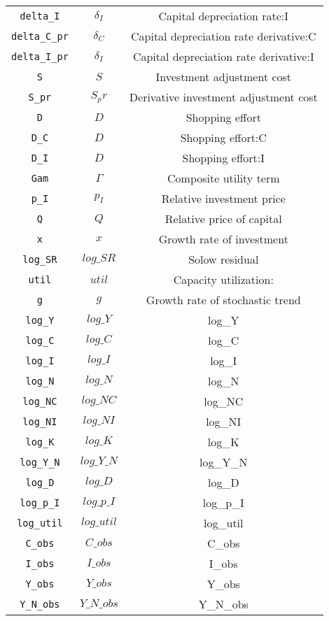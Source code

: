 \begin{center}
\begin{longtable}{ccc}
\texttt{delta\_I} & ${\delta_I}$ & Capital depreciation rate:I\\
\texttt{delta\_C\_pr} & ${\delta_C}$ & Capital depreciation rate derivative:C\\
\texttt{delta\_I\_pr} & ${\delta_I}$ & Capital depreciation rate derivative:I\\
\texttt{S} & $S$ & Investment adjustment cost\\
\texttt{S\_pr} & $S_pr$ & Derivative investment adjustment cost\\
\texttt{D} & ${D}$ & Shopping effort\\
\texttt{D\_C} & ${D}$ & Shopping effort:C\\
\texttt{D\_I} & ${D}$ & Shopping effort:I\\
\texttt{Gam} & ${\Gamma}$ & Composite utility term\\
\texttt{p\_I} & ${p_I}$ & Relative investment price\\
\texttt{Q} & ${Q}$ & Relative price of capital\\
\texttt{x} & ${x}$ & Growth rate of investment\\
\texttt{log\_SR} & $log\_SR$ & Solow residual\\
\texttt{util} & ${util}$ & Capacity utilization:\\
\texttt{g} & ${g}$ & Growth rate of stochastic trend\\
\texttt{log\_Y} & $log\_Y$ & log\_Y\\
\texttt{log\_C} & $log\_C$ & log\_C\\
\texttt{log\_I} & $log\_I$ & log\_I\\
\texttt{log\_N} & $log\_N$ & log\_N\\
\texttt{log\_NC} & $log\_NC$ & log\_NC\\
\texttt{log\_NI} & $log\_NI$ & log\_NI\\
\texttt{log\_K} & $log\_K$ & log\_K\\
\texttt{log\_Y\_N} & $log\_Y\_N$ & log\_Y\_N\\
\texttt{log\_D} & $log\_D$ & log\_D\\
\texttt{log\_p\_I} & $log\_p\_I$ & log\_p\_I\\
\texttt{log\_util} & $log\_util$ & log\_util\\
\texttt{C\_obs} & $C\_obs$ & C\_obs\\
\texttt{I\_obs} & $I\_obs$ & I\_obs\\
\texttt{Y\_obs} & $Y\_obs$ & Y\_obs\\
\texttt{Y\_N\_obs} & $Y\_N\_obs$ & Y\_N\_obs\\

\end{longtable}
\end{center}
